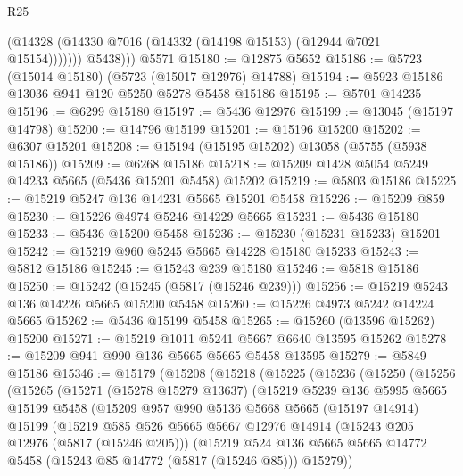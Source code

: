 \begin{lexlean}{R25}
\begin{coremodule}
              (@14328 (@14330 @7016 (@14332 (@14198 @15153) (@12944 @7021 @15154)))))))
          @5438)))
    @5571
@15180 := @12875 @5652
@15186 := @5723 (@15014 @15180) (@5723 (@15017 @12976) @14788)
@15194 := @5923 @15186 @13036 @941 @120 @5250 @5278 @5458 @15186
@15195 := @5701 @14235
@15196 := @6299 @15180
@15197 := @5436 @12976
@15199 := @13045 (@15197 @14798)
@15200 := @14796 @15199
@15201 := @15196 @15200
@15202 := @6307 @15201
@15208 := @15194 (@15195 @15202) @13058 (@5755 (@5938 @15186))
@15209 := @6268 @15186
@15218 := @15209 @1428 @5054 @5249 @14233 @5665 (@5436 @15201 @5458) @15202
@15219 := @5803 @15186
@15225 := @15219 @5247 @136 @14231 @5665 @15201 @5458
@15226 := @15209 @859
@15230 := @15226 @4974 @5246 @14229 @5665
@15231 := @5436 @15180
@15233 := @5436 @15200 @5458
@15236 := @15230 (@15231 @15233) @15201
@15242 := @15219 @960 @5245 @5665 @14228 @15180 @15233
@15243 := @5812 @15186
@15245 := @15243 @239 @15180
@15246 := @5818 @15186
@15250 := @15242 (@15245 (@5817 (@15246 @239)))
@15256 := @15219 @5243 @136 @14226 @5665 @15200 @5458
@15260 := @15226 @4973 @5242 @14224 @5665
@15262 := @5436 @15199 @5458
@15265 := @15260 (@13596 @15262) @15200
@15271 := @15219 @1011 @5241 @5667 @6640 @13595 @15262
@15278 := @15209 @941 @990 @136 @5665 @5665 @5458 @13595
@15279 := @5849 @15186
@15346 := @15179
    (@15208
      (@15218
        (@15225
          (@15236
            (@15250
              (@15256
                (@15265
                  (@15271
                    (@15278 @15279 @13637)
                    (@15219
                      @5239
                      @136
                      @5995
                      @5665
                      @15199
                      @5458
                      (@15209
                        @957
                        @990
                        @5136
                        @5668
                        @5665
                        (@15197 @14914)
                        @15199
                        (@15219
                          @585
                          @526
                          @5665
                          @5667
                          @12976
                          @14914
                          (@15243 @205 @12976 (@5817 (@15246 @205)))
                          (@15219
                            @524
                            @136
                            @5665
                            @5665
                            @14772
                            @5458
                            (@15243 @85 @14772 (@5817 (@15246 @85)))
                            @15279))

\end{coremodule}
\end{lexlean}
